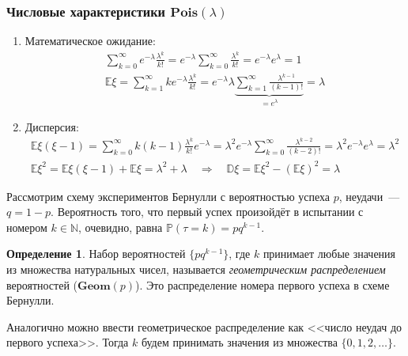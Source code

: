 \documentclass[oneside,final,14pt]{extreport}
\newcommand\myprob[1]{{\mathbb{P}(#1)}}
\theoremstyle{plain}
\theoremstyle{definition}
\newtheorem*{defn}{Определение}
\theoremstyle{named}
\begin{document}
\subsubsection{Числовые характеристики $\mathbf{Pois}(\lambda)$}
\begin{enumerate}
    \item Математическое ожидание:
    \begin{align*}
        \sum\limits_{k=0}^{\infty} e^{-\lambda} \frac{\lambda^k}{k!} = e^{-\lambda} \sum\limits_{k=0}^{\infty} \frac{\lambda^k}{k!} = e^{-\lambda} e^\lambda = 1 \\
        \mathbb{E}\xi = \sum\limits_{k=1}^{\infty} k e^{-\lambda} \frac{\lambda^k}{k!} = e^{-\lambda} \lambda \underbrace{\sum\limits_{k=1}^{\infty} \frac{\lambda^{k-1}}{(k - 1)!}}_{= e^\lambda} = \lambda
    \end{align*}
    \item Дисперсия:
    \begin{align*}
        \mathbb{E}\xi(\xi - 1) = \sum\limits_{k=0}^{\infty} k (k - 1) \frac{\lambda^k}{k!} e^{-\lambda}  = \lambda^2 e^{-\lambda} \sum\limits_{k=0}^{\infty} \frac{\lambda^{k-2}}{(k-2)!} = \lambda^2 e^{-\lambda} e^\lambda = \lambda^2 \\
        \mathbb{E}\xi^2 = \mathbb{E}\xi(\xi - 1) + \mathbb{E}\xi = \lambda^2 + \lambda \quad \Rightarrow \quad \mathbb{D}\xi = \mathbb{E}\xi^2 - (\mathbb{E}\xi)^2 = \lambda
    \end{align*}
\end{enumerate}

Рассмотрим схему экспериментов Бернулли с вероятностью успеха $p$, неудачи~--- $q = 1 - p$. Вероятность того, что первый успех произойдёт в испытании с номером $k \in \mathbb{N}$, очевидно, равна $\myprob{\tau = k} = pq^{k-1}$.

\begin{defn}
    Набор вероятностей $\{p q^{k-1}\}$, где $k$ принимает любые значения из множества натуральных чисел, называется {\it геометрическим распределением} вероятностей ($\mathbf{Geom}(p)$). Это распределение номера первого успеха в схеме Бернулли.
\end{defn}

Аналогично можно ввести геометрическое распределение как <<число неудач до первого успеха>>. Тогда $k$ будем принимать значения из множества $\{0, 1, 2, \ldots\}$.
\end{document}
